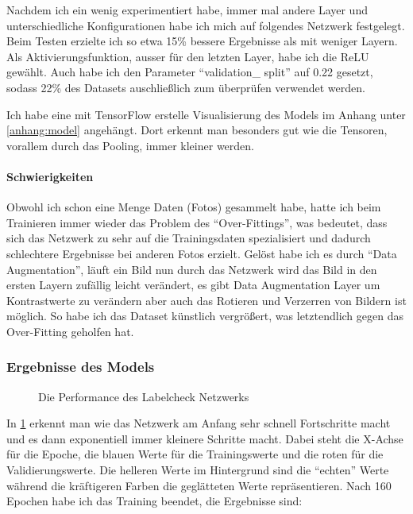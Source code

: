 Nachdem ich ein wenig experimentiert habe, immer mal andere Layer und unterschiedliche Konfigurationen habe ich mich auf folgendes Netzwerk festgelegt. Beim Testen erzielte ich so etwa 15\% bessere Ergebnisse als mit weniger Layern. Als Aktivierungsfunktion, ausser für den letzten Layer, habe ich die ReLU gewählt. Auch habe ich den Parameter "`validation\_ split"' auf 0.22 gesetzt, sodass 22\% des Datasets auschließlich zum überprüfen verwendet werden.

Ich habe eine mit TensorFlow erstelle Visualisierung des Models im Anhang unter \ref{anhang:model} angehängt. Dort erkennt man besonders gut wie die Tensoren, vorallem durch das Pooling, immer kleiner werden.

\paragraph{Schwierigkeiten}

Obwohl ich schon eine Menge Daten (Fotos) gesammelt habe, hatte ich beim Trainieren immer wieder das Problem des "`Over-Fittings"', was bedeutet, dass sich das Netzwerk zu sehr auf die Trainingsdaten spezialisiert und dadurch schlechtere Ergebnisse bei anderen Fotos erzielt. Gelöst habe ich es durch "`Data Augmentation"', läuft ein Bild nun durch das Netzwerk wird das Bild in den ersten Layern zufällig leicht verändert, es gibt Data Augmentation Layer um Kontrastwerte zu verändern aber auch das Rotieren und Verzerren von Bildern ist möglich. So habe ich das Dataset künstlich vergrößert, was letztendlich gegen das Over-Fitting geholfen hat.

\subsubsection{Ergebnisse des Models}

\begin{figure}[H]
  \centering
  \qquad
  \caption[Loss und Accuracy]{Die Performance des Labelcheck Netzwerks}
  \label{performance}
\end{figure}

In \ref{performance} erkennt man wie das Netzwerk am Anfang sehr schnell Fortschritte macht und es dann exponentiell immer kleinere Schritte macht. Dabei steht die X-Achse für die Epoche, die blauen Werte für die Trainingswerte und die roten für die Validierungswerte. Die helleren Werte im Hintergrund sind die "`echten"' Werte während die kräftigeren Farben die geglätteten Werte repräsentieren. Nach 160 Epochen habe ich das Training beendet, die Ergebnisse sind:

